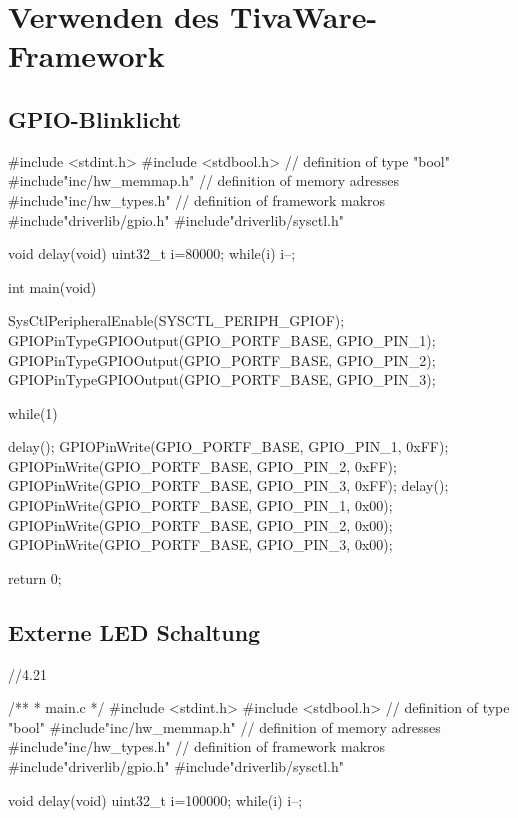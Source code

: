 \section{Verwenden des TivaWare-Framework}
\subsection{GPIO-Blinklicht}

#include <stdint.h>
 #include <stdbool.h> // definition of type "bool"
 #include"inc/hw_memmap.h" // definition of memory adresses
 #include"inc/hw_types.h" // definition of framework makros
 #include"driverlib/gpio.h"
 #include"driverlib/sysctl.h"

void delay(void)
{
  uint32_t i=80000;
  while(i) {i--;}
 }


int main(void){
    SysCtlPeripheralEnable(SYSCTL_PERIPH_GPIOF);
    GPIOPinTypeGPIOOutput(GPIO_PORTF_BASE, GPIO_PIN_1);
    GPIOPinTypeGPIOOutput(GPIO_PORTF_BASE, GPIO_PIN_2);
    GPIOPinTypeGPIOOutput(GPIO_PORTF_BASE, GPIO_PIN_3);

   while(1)
   {
       delay();
    GPIOPinWrite(GPIO_PORTF_BASE, GPIO_PIN_1, 0xFF);
    GPIOPinWrite(GPIO_PORTF_BASE, GPIO_PIN_2, 0xFF);
    GPIOPinWrite(GPIO_PORTF_BASE, GPIO_PIN_3, 0xFF);
        delay();
    GPIOPinWrite(GPIO_PORTF_BASE, GPIO_PIN_1, 0x00);
    GPIOPinWrite(GPIO_PORTF_BASE, GPIO_PIN_2, 0x00);
    GPIOPinWrite(GPIO_PORTF_BASE, GPIO_PIN_3, 0x00);


   }
    return 0;
}


\subsection{Externe LED Schaltung}

//4.21

/**
 * main.c
 */
 #include <stdint.h>
 #include <stdbool.h>                                           // definition of type "bool"
 #include"inc/hw_memmap.h"                                      // definition of memory adresses
#include"inc/hw_types.h"                                        // definition of framework makros
 #include"driverlib/gpio.h"
 #include"driverlib/sysctl.h"

void delay(void)
{
  uint32_t i=100000;
  while(i) {i--;}
 }


